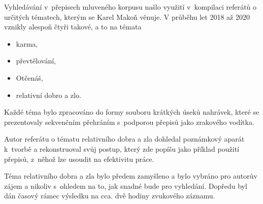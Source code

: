 Vyhledávání v~přepisech mluveného korpusu našlo využití v~kompilaci referátů o
určitých tématech, kterým se Karel Makoň věnuje. V průběhu let 2018 až 2020
vznikly alespoň čtyři takové, a to na témata
\begin{itemize}
\item{karma,}
\item{převtělování,}
\item{Otčenáš,}
\item{relativní dobro a zlo.}
\end{itemize}
Každé téma bylo zpracováno do formy souboru krátkých úseků nahrávek, které se
prezentovaly sekvenčním přehráním s~podporou přepisů jako zrakového vodítka.

Autor referátu o tématu relativního dobra a zla dohledal poznámkový aparát
k~tvorbě a rekonstruoval svůj postup, který zde popíšu jako příklad použití
přepisů, z~něhož lze usoudit na efektivitu práce.

Téma relativního dobra a zla bylo předem zamyšleno a bylo vybráno pro autorův
zájem a nikoliv s~ohledem na to, jak snadné bude pro vyhledání. Dopředu byl dán
časový rámec výsledku na cca. dvě hodiny zvukového záznamu.
